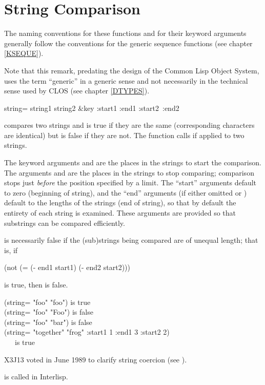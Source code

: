 \section{String Comparison}

The naming conventions for these functions and for their keyword
arguments generally follow the conventions for the generic sequence
functions (see chapter \ref{KSEQUE}).
\begin{new}
Note that this remark, predating the design of the Common Lisp Object System,
uses the term ``generic'' in a generic sense and not necessarily
in the technical sense used by CLOS
(see chapter \ref{DTYPES}).
\end{new}

\begin{defun}[Function]
string= string1 string2 &key :start1 :end1 :start2~:end2

 compares two strings and is true if
they are the same (corresponding characters are identical)
but is false if they are not.
The function  calls  if
applied to two strings.

The keyword arguments  and  are the places
in the strings to start the comparison.
The arguments  and  are the
places in the strings to stop comparing; comparison stops just
\emph{before} the position specified by a limit.
The ``start'' arguments default to zero (beginning of string),
and the ``end'' arguments (if either omitted or {\false})
default to the lengths of the strings (end of string),
so that by default the entirety of each string is examined.
These arguments are provided so that substrings can be compared
efficiently.

 is necessarily false if the (sub)strings
being compared are of unequal length; that is, if
\begin{lisp}
(not (= (- end1 start1) (- end2 start2)))
\end{lisp}
is true, then  is false.

\begin{lisp}
(string= "foo" "foo") {\rm is true} \\
(string= "foo" "Foo") {\rm is false} \\
(string= "foo" "bar") {\rm is false} \\
(string= "together" "frog" :start1 1 :end1 3 :start2 2) \\
~~~{\rm is true}
\end{lisp}

\begin{newer}
X3J13 voted in June 1989 
to clarify string coercion (see ).
\end{newer}

\beforenoterule
\begin{incompatibility}
 is called  in Interlisp.
\end{incompatibility}
\afternoterule
\end{defun}

